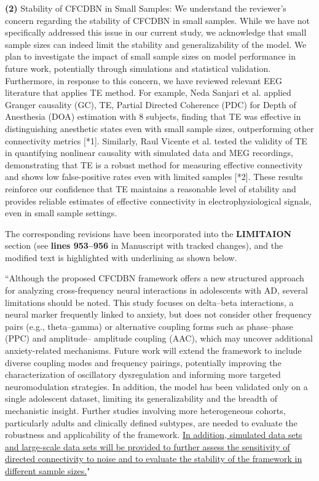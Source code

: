 \documentclass[12pt,technote,onecolumn]{IEEEtran}
\begin{document}
\textbf{(2)} Stability of CFCDBN in Small Samples:
We understand the reviewer’s concern regarding the stability of CFCDBN in small samples. While we have not specifically addressed this issue in our current study, we acknowledge that small sample sizes can indeed limit the stability and generalizability of the model. We plan to investigate the impact of small sample sizes on model performance in future work, potentially through simulations and statistical validation. Furthermore, in response to this concern, we have reviewed relevant EEG literature that applies TE method. For example, Neda Sanjari et al. applied Granger causality (GC), TE, Partial Directed Coherence (PDC) for Depth of Anesthesia (DOA) estimation with 8 subjects, finding that TE was effective in distinguishing anesthetic states even with small sample sizes, outperforming other connectivity metrics [*1]. Similarly, Raul Vicente et al. tested the validity of TE in quantifying nonlinear causality with simulated data and MEG recordings, demonstrating that TE is a robust method for measuring effective connectivity and shows low false-positive rates even with limited samples [*2]. These results reinforce our confidence that TE maintains a reasonable level of stability and provides reliable estimates of effective connectivity in electrophysiological signals, even in small sample settings.


The corresponding revisions have been incorporated into the \textbf{LIMITAION} section (see \textbf{lines 953–956} in Manuscript with tracked changes), and the modified text is highlighted with underlining as shown below.

``Although the proposed CFCDBN framework offers a new
structured approach for analyzing cross-frequency neural interactions
in adolescents with AD, several limitations should
be noted. This study focuses on delta–beta interactions, a
neural marker frequently linked to anxiety, but does not
consider other frequency pairs (e.g., theta–gamma) or alternative
coupling forms such as phase–phase (PPC) and amplitude–
amplitude coupling (AAC), which may uncover additional
anxiety-related mechanisms. Future work will extend the
framework to include diverse coupling modes and frequency
pairings, potentially improving the characterization of oscillatory
dysregulation and informing more targeted neuromodulation
strategies. In addition, the model has been validated only
on a single adolescent dataset, limiting its generalizability and
the breadth of mechanistic insight. Further studies involving more heterogeneous cohorts, particularly adults and clinically defined subtypes, are needed to evaluate the robustness and applicability of the framework. \uline{In addition, simulated data sets and large-scale data sets will be provided to further assess the sensitivity of directed connectivity to noise and to evaluate the stability of the framework in different sample sizes.}"
\end{document}
